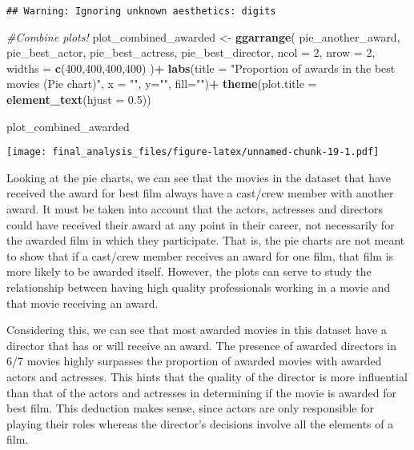 \documentclass[]{article}
\newenvironment{Shaded}{\begin{snugshade}}{\end{snugshade}}
\newcommand{\KeywordTok}[1]{\textcolor[rgb]{0.13,0.29,0.53}{\textbf{#1}}}
\newcommand{\DataTypeTok}[1]{\textcolor[rgb]{0.13,0.29,0.53}{#1}}
\newcommand{\DecValTok}[1]{\textcolor[rgb]{0.00,0.00,0.81}{#1}}
\newcommand{\FloatTok}[1]{\textcolor[rgb]{0.00,0.00,0.81}{#1}}
\newcommand{\StringTok}[1]{\textcolor[rgb]{0.31,0.60,0.02}{#1}}
\newcommand{\CommentTok}[1]{\textcolor[rgb]{0.56,0.35,0.01}{\textit{#1}}}
\newcommand{\OperatorTok}[1]{\textcolor[rgb]{0.81,0.36,0.00}{\textbf{#1}}}
\newcommand{\NormalTok}[1]{#1}
\begin{document}
\begin{verbatim}
## Warning: Ignoring unknown aesthetics: digits
\end{verbatim}

\begin{Shaded}
\begin{Highlighting}[]
 \CommentTok{#Combine plots!}
\NormalTok{ plot_combined_awarded <-}
\StringTok{   }\KeywordTok{ggarrange}\NormalTok{(}
\NormalTok{     pie_another_award,}
\NormalTok{     pie_best_actor,}
\NormalTok{    pie_best_actress,}
\NormalTok{    pie_best_director,}
    \DataTypeTok{ncol =} \DecValTok{2}\NormalTok{,}
    \DataTypeTok{nrow =} \DecValTok{2}\NormalTok{,}
    \DataTypeTok{widths =} \KeywordTok{c}\NormalTok{(}\DecValTok{400}\NormalTok{,}\DecValTok{400}\NormalTok{,}\DecValTok{400}\NormalTok{,}\DecValTok{400}\NormalTok{)}
\NormalTok{  )}\OperatorTok{+}
\StringTok{  }\KeywordTok{labs}\NormalTok{(}\DataTypeTok{title =} \StringTok{"Proportion of awards in the best movies (Pie chart)"}\NormalTok{, }\DataTypeTok{x =} \StringTok{""}\NormalTok{, }\DataTypeTok{y=}\StringTok{""}\NormalTok{, }\DataTypeTok{fill=}\StringTok{""}\NormalTok{)}\OperatorTok{+}
\StringTok{  }\KeywordTok{theme}\NormalTok{(}\DataTypeTok{plot.title =} \KeywordTok{element_text}\NormalTok{(}\DataTypeTok{hjust =} \FloatTok{0.5}\NormalTok{))}

\NormalTok{plot_combined_awarded}
\end{Highlighting}
\end{Shaded}

\texttt{[image: final\_analysis\_files/figure-latex/unnamed-chunk-19-1.pdf]}

Looking at the pie charts, we can see that the movies in the dataset
that have received the award for best film always have a cast/crew
member with another award. It must be taken into account that the
actors, actresses and directors could have received their award at any
point in their career, not necessarily for the awarded film in which
they participate. That is, the pie charts are not meant to show that if
a cast/crew member receives an award for one film, that film is more
likely to be awarded itself. However, the plots can serve to study the
relationship between having high quality professionals working in a
movie and that movie receiving an award.

Considering this, we can see that most awarded movies in this dataset
have a director that has or will receive an award. The presence of
awarded directors in 6/7 movies highly surpasses the proportion of
awarded movies with awarded actors and actresses. This hints that the
quality of the director is more influential than that of the actors and
actresses in determining if the movie is awarded for best film. This
deduction makes sense, since actors are only responsible for playing
their roles whereas the director's decisions involve all the elements of
a film.
\end{document}
